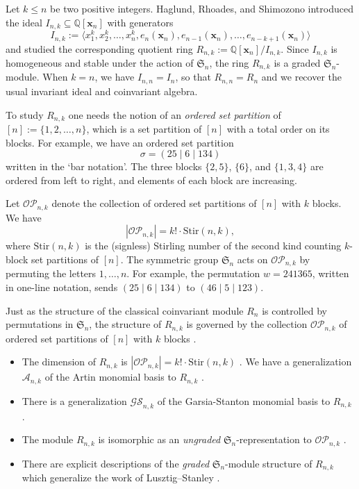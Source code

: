 \documentclass[ALCO,ThmDefs,published]{cedram}
\newcommand{\symm}{{\mathfrak{S}}}
\newcommand{\QQ}{{\mathbb {Q}}}
\newcommand{\xx}{{\mathbf {x}}}
\theoremstyle{plain}
\newcommand{\Stir}{{\mathrm {Stir}}}
\newcommand{\symm}{{\mathfrak{S}}}
\newcommand{\QQ}{{\mathbb {Q}}}
\newcommand{\OP}{{\mathcal{OP}}}
\newcommand{\AAA}{{\mathcal{A}}}
\newcommand{\GS}{{\mathcal{GS}}}
\newcommand{\xx}{{\mathbf {x}}}
\begin{document}
Let $k \leq n$ be two positive integers.  Haglund, Rhoades, and Shimozono \cite[Defn. 1.1]{HRS} introduced
the ideal $I_{n,k} \subseteq \QQ[\xx_n]$ with generators 
\begin{equation}
I_{n,k} := \langle x_1^k, x_2^k, \dots, x_n^k, e_n(\xx_n), e_{n-1}(\xx_n), \dots, e_{n-k+1}(\xx_n) \rangle
\end{equation}
and studied the corresponding quotient ring $R_{n,k} := {\QQ[\xx_n]} / {I_{n,k}}$.  Since $I_{n,k}$ is homogeneous
and
stable 
under the action of $\symm_n$, the ring $R_{n,k}$ is a graded $\symm_n$-module.
When $k = n$, we have $I_{n,n} = I_n$, so that   $R_{n,n} = R_n$ and we recover the usual 
invariant ideal and coinvariant algebra.

To study $R_{n,k}$ one needs the notion of an \emph{ordered set partition} of $[n] := \{1, 2, \dots, n\}$, which is a set partition of $[n]$ with a total order on its blocks.
For example, we have an ordered set partition
\begin{equation*}
\sigma = (25 \mid 6 \mid 134)
\end{equation*}
written in the `bar notation'. The three blocks $\{2,5\}$, $\{6\}$, and $\{1,3,4\}$ are ordered from left to right, and elements of each block are increasing.

Let $\OP_{n,k}$ denote the collection of ordered set partitions of $[n]$ with $k$ blocks.  We have
\begin{equation}
|\OP_{n,k}| = k! \cdot \Stir(n,k),
\end{equation}
where $\Stir(n,k)$ is the (signless) Stirling number of the second kind counting $k$-block
set partitions of $[n]$.
The symmetric group $\symm_n$ acts on $\OP_{n,k}$ by permuting the letters $1,\ldots,n$.  For example, the permutation $w=241365$, written in one-line notation, sends $(25 \mid 6 \mid 134)$ to $(46 \mid 5 \mid 123)$.

Just as the  structure of the classical coinvariant module $R_n$ is controlled by permutations
in $\symm_n$, the structure of $R_{n,k}$ is governed by  the collection $\OP_{n,k}$ of
ordered set partitions of $[n]$ with $k$ blocks \cite{HRS}.  
\begin{itemize}
\item  The dimension of $R_{n,k}$ is $|\OP_{n,k}| = k! \cdot \Stir(n,k)$ \cite[Thm. 4.11]{HRS}.
We have a generalization $\AAA_{n,k}$ of the Artin monomial basis to $R_{n,k}$ \cite[Thm. 4.13]{HRS}.
\item There is a generalization
$\GS_{n,k}$ of the Garsia-Stanton monomial basis to $R_{n,k}$ \cite[Thm. 5.3]{HRS}.
\item The module $R_{n,k}$ is isomorphic as an \emph{ungraded} $\symm_n$-representation to $\OP_{n,k}$ \cite[Thm. 4.11]{HRS}.
\item There are explicit descriptions of the \emph{graded} $\symm_n$-module structure of $R_{n,k}$
which generalize the work of Lusztig--Stanley \cite[Thm 6.11, Cor. 6.12, Cor. 6.13, Thm. 6.14]{HRS}.
\end{itemize}
\end{document}
